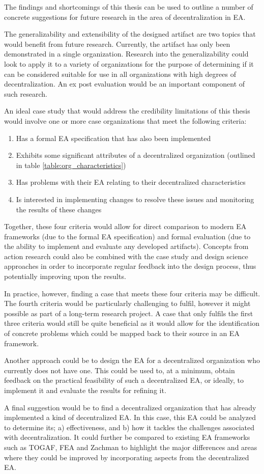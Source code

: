 The findings and shortcomings of this thesis can be used to outline a number of concrete suggestions for future research in the area of decentralization in EA. 

The generalizability and extensibility of the designed artifact are two topics that would benefit from future research. Currently, the artifact has only been demonstrated in a single organization. Research into the generalizability could look to apply it to a variety of organizations for the purpose of determining if it can be considered suitable for use in all organizations with high degrees of decentralization. An ex post evaluation would be an important component of such research.

An ideal case study that would address the credibility limitations of this thesis would involve one or more case organizations that meet the following criteria:

\begin{enumerate}
\item Has a formal EA specification that has also been implemented
\item Exhibits some significant attributes of a decentralized organization (outlined in table \ref{table:org_characteristics})
\item Has problems with their EA relating to their decentralized characteristics
\item Is interested in implementing changes to resolve these issues and monitoring the results of these changes
\end{enumerate}

Together, these four criteria would allow for direct comparison to modern EA frameworks (due to the formal EA specification) and formal evaluation (due to the ability to implement and evaluate any developed artifacts). Concepts from action research could also be combined with the case study and design science approaches in order to incorporate regular feedback into the design process, thus potentially improving upon the results. 

In practice, however, finding a case that meets these four criteria may be difficult. The fourth criteria would be particularly challenging to fulfil, however it might possible as part of a long-term research project. A case that only fulfils the first three criteria would still be quite beneficial as it would allow for the identification of concrete problems which could be mapped back to their source in an EA framework. 

Another approach could be to design the EA for a decentralized organization who currently does not have one. This could be used to, at a minimum, obtain feedback on the practical feasibility of such a decentralized EA, or ideally, to implement it and evaluate the results for refining it. 

A final suggestion would be to find a decentralized organization that has already implemented a kind of decentralized EA. In this case, this EA could be analyzed to determine its; a) effectiveness, and b) how it tackles the challenges associated with decentralization. It could further be compared to existing EA frameworks such as TOGAF, FEA and Zachman to highlight the major differences and areas where they could be improved by incorporating aspects from the decentralized EA. 